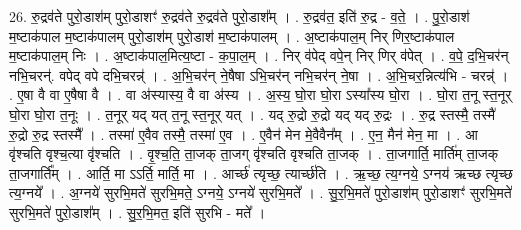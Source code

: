 \documentclass[17pt]{extarticle}
\begin{document}
26. रु॒द्रव॑ते पुरो॒डाश॑म् पुरो॒डाशꣳ॑ रु॒द्रव॑ते रु॒द्रव॑ते पुरो॒डाश᳚म् । . रु॒द्रव॑त॒ इति॑ रु॒द्र - व॒ते॒ । . पु॒रो॒डाश॑ म॒ष्टाक॑पाल म॒ष्टाक॑पालम् पुरो॒डाश॑म् पुरो॒डाश॑ म॒ष्टाक॑पालम् । . अ॒ष्टाक॑पाल॒म् निर् णिर॒ष्टाक॑पाल म॒ष्टाक॑पाल॒म् निः । . अ॒ष्टाक॑पाल॒मित्य॒ष्टा - क॒पा॒ल॒म् । . निर् व॑पेद् वपे॒न् निर् णिर् व॑पेत् । . व॒पे॒ द॒भि॒चर॑न् नभि॒चरन्॑. वपेद् वपे दभि॒चरन्न्॑ । . अ॒भि॒चर॑न् ने॒षैषा ऽभि॒चर॑न् नभि॒चर॑न् ने॒षा । . अ॒भि॒चर॒न्नित्य॑भि - चरन्न्॑ । . ए॒षा वै वा ए॒षैषा वै । . वा अ॑स्यास्य॒ वै वा अ॑स्य । . अ॒स्य॒ घो॒रा घो॒रा ऽस्या᳚स्य घो॒रा । . घो॒रा त॒नू स्त॒नूर् घो॒रा घो॒रा त॒नूः । . त॒नूर् यद् यत् त॒नू स्त॒नूर् यत् । . यद् रु॒द्रो रु॒द्रो यद् यद् रु॒द्रः । . रु॒द्र स्तस्मै॒ तस्मै॑ रु॒द्रो रु॒द्र स्तस्मै᳚ । . तस्मा॑ ए॒वैव तस्मै॒ तस्मा॑ ए॒व । . ए॒वैन॑ मेन मे॒वैवैन᳚म् । . ए॒न॒ मैन॑ मेन॒ मा । . आ वृ॑श्चति वृश्च॒त्या वृ॑श्चति । . वृ॒श्च॒ति॒ ता॒जक् ता॒जग् वृ॑श्चति वृश्चति ता॒जक् । . ता॒जगार्ति॒ मार्ति॑म् ता॒जक् ता॒जगार्ति᳚म् । . आर्ति॒ मा ऽऽर्ति॒ मार्ति॒ मा । . आर्च्छ॑ त्यृच्छ॒ त्यार्च्छ॑ति । . ऋ॒च्छ॒ त्य॒ग्नये॒ ऽग्नय॑ ऋच्छ त्यृच्छ त्य॒ग्नये᳚ । . अ॒ग्नये॑ सुरभि॒मते॑ सुरभि॒मते॒ ऽग्नये॒ ऽग्नये॑ सुरभि॒मते᳚ । . सु॒र॒भि॒मते॑ पुरो॒डाश॑म् पुरो॒डाशꣳ॑ सुरभि॒मते॑ सुरभि॒मते॑ पुरो॒डाश᳚म् । . सु॒र॒भि॒मत॒ इति॑ सुरभि - मते᳚ । \newline
\end{document}
